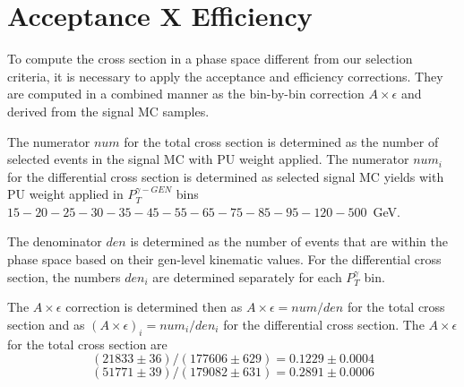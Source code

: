 \section{Acceptance X Efficiency}
\label{sec:AccXEff}

To compute the cross section in a phase space different from our selection criteria, it is necessary to apply the acceptance and efficiency corrections. They are computed in a combined manner as the bin-by-bin correction $A \times \epsilon$ and derived from the signal MC samples.  

The numerator $num$ for the total cross section is determined as the number of selected events in the signal MC with PU weight applied. The numerator $num_i$ for the differential cross section is determined as selected signal MC yields with PU weight applied in $P_T^{\gamma-GEN}$ bins $15-20-25-30-35-45-55-65-75-85-95-120-500$~GeV. 

The denominator $den$ is determined as the number of events that are within the phase space based on their gen-level kinematic values. For the differential cross section, the numbers $den_{i}$ are determined separately for each $P_T^\gamma$ bin.  

The $A \times \epsilon$ correction is determined then as $A \times \epsilon = num/{den}$ for the total cross section and as $(A \times \epsilon)_i = num_i/{den_i}$ for the differential cross section. The $A \times \epsilon$ for the total cross section are
\begin{equation}
(21833 \pm 36)/(177606 \pm 629)=0.1229 \pm 0.0004
\end{equation}
\begin{equation}
(51771 \pm 39)/(179082 \pm 631)=0.2891 \pm 0.0006
\end{equation}

